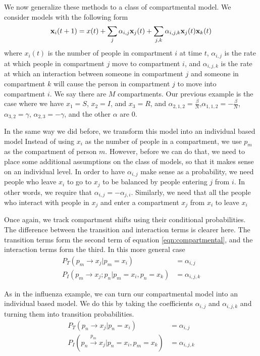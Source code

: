 \documentclass{article}
\renewcommand{\vec}[1]{{\textbf #1}}
\begin{document}
We now generalize these methods to a class of compartmental model.  We consider models with the following form
\begin{align}\label{eqn:compartmental}
\vec{x}_i(t+1) = x(t) + \sum_{j} \alpha_{i,j} \vec{x}_j(t) +  \sum_{j,k} \alpha_{i,j,k} \vec{x}_j(t) \vec x_k(t)
\end{align}
where $x_i(t)$ is the number of people in compartment $i$ at time $t$, $\alpha_{i,j}$ is the rate at which people in compartment $j$ move to compartment $i$, and $\alpha_{i,j,k}$ is the rate at which an interaction between someone in compartment $j$ and someone in compartment $k$ will cause the person in compartment $j$ to move into compartment $i$.  We say there are $M$ compartments.  Our previous example is the case where we have $x_1=S$, $x_2=I$, and $x_3=R$, and $\alpha_{2,1,2} = \frac{\beta}{N}$,$\alpha_{1,1,2} = -\frac{\beta}{N}$, $\alpha_{3,2} = \gamma$, $\alpha_{2,3} = -\gamma$, and the other $\alpha$ are $0$.

In the same way we did before, we transform this model into an individual based model  Instead of using $x_i$ as the number of people in a compartment, we use $p_m$ as the compartment of person $m$.  However, before we can do that, we need to place some additional assumptions on the class of models, so that it makes sense on an individual level.  In order to have $\alpha_{i,j}$ make sense as a probability, we need people who leave $x_i$ to go to $x_j$ to be balanced by people entering $j$ from $i$.  In other words, we require that $\alpha_{i,j} = - \alpha_{j,i}$.  Similarly, we need that all the people who interact with people in $x_j$ and enter a compartment $x_j$ from $x_i$ to leave $x_i$

Once again, we track compartment shifts using their conditional probabilities.  The difference between the transition and interaction terms is clearer here.  The transition terms form the second term of equation \ref{eqn:compartmental}, and the interaction terms form the third.  In this more general case
\begin{align*}
   P_T(p_m \rightarrow x_j \vert p_m = x_i) &= \alpha_{i,j}
\\ P_I(p_m \rightarrow x_j; p_n \vert p_m = x_i, p_n = x_k) &= \alpha_{i,j,k}
\end{align*}

As in the influenza example, we can turn our compartmental model into an individual based model.  We do this by taking the coefficients $\alpha_{i,j}$ and $\alpha_{i,j,k}$ and turning them into transition probabilities.
\begin{align*}
   P_T(p_n \rightarrow x_j \vert p_n = x_i ) &= \alpha_{i,j}
\\ P_I(p_n \xrightarrow{p_m} x_j  \vert p_n = x_i, p_m = x_k) &= \alpha_{i,j,k}
\end{align*}
\end{document}
